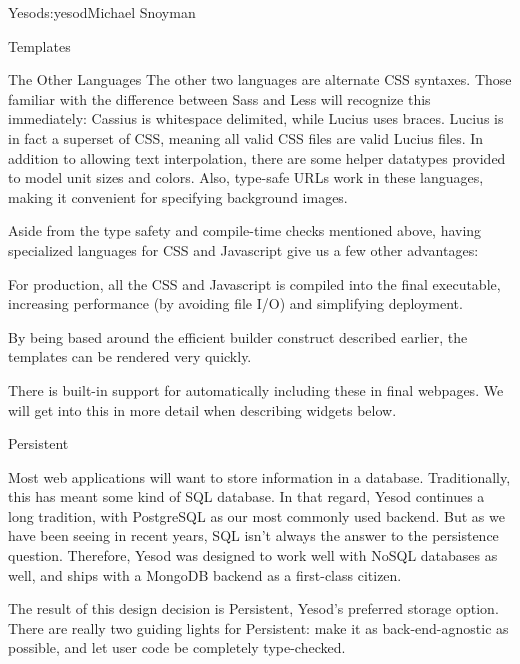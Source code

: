 \begin{aosachapter}{Yesod}{s:yesod}{Michael Snoyman}
\begin{aosasect1}{Templates}
\begin{aosasect2}{The Other Languages}
The other two languages are alternate CSS syntaxes. Those familiar
with the difference between Sass and Less will recognize this
immediately: Cassius is whitespace delimited, while Lucius uses
braces. Lucius is in fact a superset of CSS, meaning all valid CSS
files are valid Lucius files. In addition to allowing text
interpolation, there are some helper datatypes provided to model unit
sizes and colors. Also, type-safe URLs work in these languages, making
it convenient for specifying background images.

Aside from the type safety and compile-time checks mentioned above,
having specialized languages for CSS and Javascript give us a few
other advantages:

\begin{aosaitemize}

\item For production, all the CSS and Javascript is compiled into the
  final executable, increasing performance (by avoiding file I/O) and
  simplifying deployment.

\item By being based around the efficient builder construct described
  earlier, the templates can be rendered very quickly.

\item There is built-in support for automatically including these in
  final webpages. We will get into this in more detail when describing
  widgets below.

\end{aosaitemize}

\end{aosasect2}

\end{aosasect1}

\begin{aosasect1}{Persistent}

Most web applications will want to store information in a
database. Traditionally, this has meant some kind of SQL database. In
that regard, Yesod continues a long tradition, with PostgreSQL as our
most commonly used backend. But as we have been seeing in recent
years, SQL isn't always the answer to the persistence
question. Therefore, Yesod was designed to work well with NoSQL
databases as well, and ships with a MongoDB backend as a first-class
citizen.

The result of this design decision is Persistent, Yesod's preferred
storage option. There are really two guiding lights for Persistent:
make it as back-end-agnostic as possible, and let user code be
completely type-checked.


\end{aosasect1}
\end{aosachapter}
